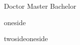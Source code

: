 %
%
%










\newif\ifxueweidoctor
\newif\ifxueweimaster
\newif\ifxueweibachelor


\def\temp{Doctor}
\ifx\temp\xuewei %
  \xueweidoctortrue  \xueweimasterfalse \xueweibachelorfalse
\fi
\def\temp{Master}
\ifx\temp\xuewei
  \xueweidoctorfalse  \xueweimastertrue \xueweibachelorfalse
\fi
\def\temp{Bachelor}
\ifx\temp\xuewei
  \xueweidoctorfalse  \xueweimasterfalse \xueweibachelortrue
\fi


\ifxueweidoctor
  \newcommand{\cxuewei}{博士}
  \newcommand{\exuewei}{Doctor}
  \newcommand{\exueweier}{Doctoral}
  \newcommand{\xueweishort}{博}
\fi

\ifxueweimaster
  \newcommand{\cxuewei}{硕士}
  \newcommand{\exuewei}{Master}
  \newcommand{\exueweier}{Master}
  \newcommand{\xueweishort}{硕}
\fi

\ifxueweibachelor
  \newcommand{\cxuewei}{本科生}
  \newcommand{\exuewei}{Bachelor}
  \newcommand{\exueweier}{Bachelor}
  \newcommand{\xueweishort}{本}
\fi





\ifxueweidoctor %
  \def\oneortwoside{twoside}
\fi

\ifxueweimaster %
  \def\oneortwoside{twoside}
\fi

\ifxueweibachelor %
  \def\oneortwoside{oneside}
\fi


\ifx\oneortwoside\undefined
  \def\oneortwoside{oneside}
\fi




\newif\ifoneortwoside


\def\temp{twoside}
\ifx\temp\oneortwoside
  \oneortwosidetrue
\else
  \oneortwosidefalse
\fi
